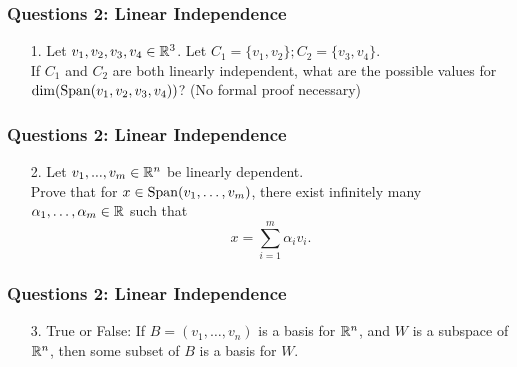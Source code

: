 \documentclass{beamer}
\begin{document}


\begin{frame}[t]
	\frametitle{Questions 2: Linear Independence}
	\grid
	\begin{enumerate}
		\item[1.] Let $v_1,v_2,v_3,v_4 \in \mathbb{R}^3$. Let $C_1 = \{v_1,v_2\}; C_2 = \{v_3,v_4\}$. \\
			If $C_1$ and $C_2$ are both linearly independent, 
			what are the possible values for ${{\rm dim}}({{\rm Span}}(v_1,v_2,v_3,v_4))$? (No formal proof necessary)
			\pause
	\end{enumerate}
\end{frame}
\begin{frame}[t]
	\frametitle{Questions 2: Linear Independence}
	\grid
	\begin{enumerate}
		\item[2.] Let $v_1,...,v_m \in \mathbb{R}^n$ be linearly dependent. \\
			Prove that for $x \in {{\rm Span}}(v_1,\dots,v_m)$, 
			there exist infinitely many $\alpha_1,\dots,\alpha_m \in \mathbb{R}$ 
			such that 
			\vspace{-0.3cm}
			$$
			x = \sum_{i=1}^m \alpha_i v_i.
			$$
			\pause
	\end{enumerate}
\end{frame}
\begin{frame}[t]
	\frametitle{Questions 2: Linear Independence}
	\grid
	\begin{enumerate}
		\item[3.] True or False: If $B=(v_1,\ldots,v_n)$ is a basis for $\mathbb{R}^n$,
			and $W$ is a subspace of $\mathbb{R}^n$, then some subset of $B$ is a basis
			for $W$.
	\end{enumerate}
\end{frame}
\end{document}
